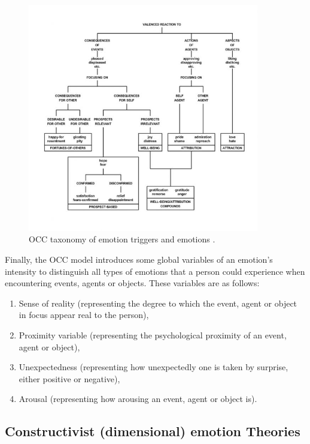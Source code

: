 \documentclass[11pt]{article}
\begin{document}
\begin{figure}[tbh]
  \center
  \includegraphics[width=0.9\textwidth]{figure/occ-structure.jpg}
  \caption{OCC taxonomy of emotion triggers and emotions \cite{occ:structure}.}
  \label{fig:occ-structure}
\end{figure}

Finally, the OCC model introduces some global variables of an emotion's
intensity to distinguish all types of emotions that a person could experience when
encountering events, agents or objects. These variables are as follows:

\begin{enumerate}
	\item Sense of reality (representing the degree to which the event, agent or
	object in focus appear real to the person),

	\item Proximity variable (representing the psychological proximity of an event,
	agent or object),

	\item Unexpectedness (representing how unexpectedly one is taken by surprise,
	either positive or negative),

	\item Arousal (representing how arousing an event, agent or object is).
\end{enumerate}

\subsection{Constructivist (dimensional) emotion Theories}
\label{sec:dimensional-emotions}
\end{document}
